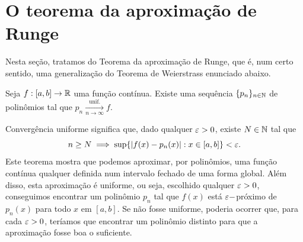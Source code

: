 \section{O teorema da aproximação de Runge}
\label{sec:aprox-runge}

    Nesta seção, tratamos do Teorema da aproximação de Runge, que é, num certo sentido, uma generalização do Teorema de Weierstrass enunciado abaixo.
    
    \begin{teorema}[Weierstrass]
    \label{teo:aprox-weierstrass}
        Seja $f:[a,b] \to \mathbb{R}$ uma função contínua. Existe uma sequência $\{p_n\}_{n\in\mathbb{N}}$ 
        de polinômios tal que $p_n \xrightarrow[n\to\infty]{\text{unif.}} f$.
    \end{teorema}
    
    Convergência uniforme significa que, dado qualquer $\varepsilon > 0$, existe $N \in \mathbb{N}$ 
    tal que 
    \begin{equation*}
        n \geq N \implies \sup \{|f(x) - p_n(x)| : x \in [a,b] \} < \varepsilon.
    \end{equation*}
    Este teorema mostra que podemos aproximar, por polinômios, uma função contínua qualquer 
    definida num intervalo fechado de uma forma global. Além disso, esta aproximação é uniforme, 
    ou seja, escolhido qualquer $\varepsilon > 0$, conseguimos encontrar um polinômio $p_n$ 
    tal que $f(x)$ está $\varepsilon-$próximo de $p_n(x)$ para todo $x$ em $[a,b]$. 
    Se não fosse uniforme, poderia ocorrer que, para cada $\varepsilon > 0$, 
    teríamos que encontrar um polinômio distinto para que a aproximação fosse boa o suficiente.
    
